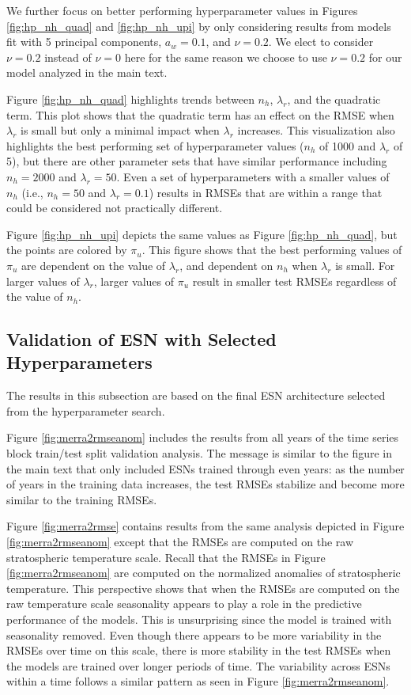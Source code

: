 \documentclass[AMS,STIX2COL]{WileyNJD-v2}
\begin{document}
We further focus on better performing hyperparameter values in Figures \ref{fig:hp_nh_quad} and \ref{fig:hp_nh_upi} by only considering results from models fit with 5 principal components, $a_w=0.1$, and $\nu=0.2$. We elect to consider $\nu=0.2$ instead of $\nu=0$ here for the same reason we choose to use $\nu=0.2$ for our model analyzed in the main text. 

Figure \ref{fig:hp_nh_quad} highlights trends between $n_h$, $\lambda_r$, and the quadratic term. This plot shows that the quadratic term has an effect on the RMSE when $\lambda_r$ is small but only a minimal impact when $\lambda_r$ increases. This visualization also highlights the best performing set of hyperparameter values ($n_h$ of 1000 and $\lambda_r$ of 5), but there are other parameter sets that have similar performance including $n_h=2000$ and $\lambda_r=50$. Even a set of hyperparameters with a smaller values of $n_h$ (i.e., $n_h=50$ and $\lambda_r=0.1$) results in RMSEs that are within a range that could be considered not practically different.

Figure \ref{fig:hp_nh_upi} depicts the same values as Figure \ref{fig:hp_nh_quad}, but the points are colored by $\pi_u$. This figure shows that the best performing values of $\pi_u$ are dependent on the value of $\lambda_r$, and dependent on $n_h$ when $\lambda_r$ is small. For larger values of $\lambda_r$, larger values of $\pi_u$ result in smaller test RMSEs regardless of the value of $n_h$.

\subsection{Validation of ESN with Selected Hyperparameters} \label{sec:hps}

The results in this subsection are based on the final ESN architecture selected from the hyperparameter search.

Figure \ref{fig:merra2rmseanom} includes the results from all years of the time series block train/test split validation analysis. The message is similar to the figure in the main text that only included ESNs trained through even years: as the number of years in the training data increases, the test RMSEs stabilize and become more similar to the training RMSEs.

Figure \ref{fig:merra2rmse} contains results from the same analysis depicted in Figure \ref{fig:merra2rmseanom} except that the RMSEs are computed on the raw stratospheric temperature scale. Recall that the RMSEs in Figure \ref{fig:merra2rmseanom} are computed on the normalized anomalies of stratospheric temperature. This perspective shows that when the RMSEs are computed on the raw temperature scale seasonality appears to play a role in the predictive performance of the models. This is unsurprising since the model is trained with seasonality removed. Even though there appears to be more variability in the RMSEs over time on this scale, there is more stability in the test RMSEs when the models are trained over longer periods of time. The variability across ESNs within a time follows a similar pattern as seen in Figure \ref{fig:merra2rmseanom}.
\end{document}
